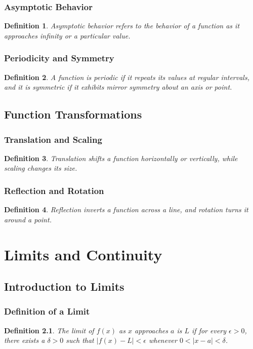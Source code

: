 \documentclass[a4paper,12pt]{book}
\newtheorem{definition}{Definition}
\begin{document}
\subsection{Asymptotic Behavior}
\begin{definition}
Asymptotic behavior refers to the behavior of a function as it approaches infinity or a particular value.
\end{definition}

\subsection{Periodicity and Symmetry}
\begin{definition}
A function is periodic if it repeats its values at regular intervals, and it is symmetric if it exhibits mirror symmetry about an axis or point.
\end{definition}

\section{Function Transformations}
\subsection{Translation and Scaling}
\begin{definition}
Translation shifts a function horizontally or vertically, while scaling changes its size.
\end{definition}

\subsection{Reflection and Rotation}
\begin{definition}
Reflection inverts a function across a line, and rotation turns it around a point.
\end{definition}

\chapter{Limits and Continuity}
\section{Introduction to Limits}
\subsection{Definition of a Limit}
\begin{definition}
The limit of \( f(x) \) as \( x \) approaches \( a \) is \( L \) if for every \( \epsilon > 0 \), there exists a \( \delta > 0 \) such that \( |f(x) - L| < \epsilon \) whenever \( 0 < |x - a| < \delta \).
\end{definition}
\end{document}
